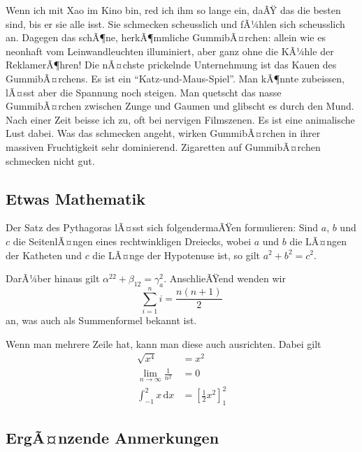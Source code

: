 \documentclass{scrartcl}
\begin{document}
  Wenn ich mit Xao im Kino bin, red ich ihm so lange ein, daÃŸ das die besten sind, bis er sie alle isst. Sie schmecken scheusslich und fÃ¼hlen sich scheusslich an. Dagegen das schÃ¶ne, herkÃ¶mmliche GummibÃ¤rchen: allein wie es neonhaft vom Leinwandleuchten illuminiert, aber ganz ohne die KÃ¼hle der ReklamerÃ¶hren! Die nÃ¤chste prickelnde Unternehmung ist das Kauen des GummibÃ¤rchens. Es ist ein \enquote{Katz-und-Maus-Spiel}. Man kÃ¶nnte zubeissen, lÃ¤sst aber die Spannung noch steigen. Man quetscht das nasse GummibÃ¤rchen zwischen Zunge und Gaumen und glibscht es durch den Mund. Nach einer Zeit beisse ich zu, oft bei nervigen Filmszenen. Es ist eine animalische Lust dabei. Was das schmecken angeht, wirken GummibÃ¤rchen in ihrer massiven Fruchtigkeit sehr dominierend. Zigaretten auf GummibÃ¤rchen schmecken nicht gut.

  \subsection{Etwas Mathematik}

  Der Satz des Pythagoras lÃ¤sst sich folgendermaÃŸen formulieren: Sind $a$, $b$ und $c$ die SeitenlÃ¤ngen eines rechtwinkligen Dreiecks, wobei $a$ und $b$ die LÃ¤ngen der Katheten und $c$ die LÃ¤nge der Hypotenuse ist, so gilt $a^2 + b^2 = c^2$.

  DarÃ¼ber hinaus gilt $\alpha^{22} + \beta_{12} = \gamma^2_a$. AnschlieÃŸend wenden wir
  \[ \sum^n_{i=1}i = \frac{n(n+1)}2 \]
  an, was auch als Summenformel bekannt ist.

  Wenn man mehrere Zeile hat, kann man diese auch ausrichten. Dabei gilt
  \begin{align*}
    \sqrt{x^4} &= x^2\\
    \lim_{n\to\infty} \frac 1{n^2} &= 0 \\
    \int_{-1}^2 x\, \mathrm{d}x &= \left[ \frac12 x^2 \right]_1^2
  \end{align*}

  \subsection{ErgÃ¤nzende Anmerkungen}
\end{document}
